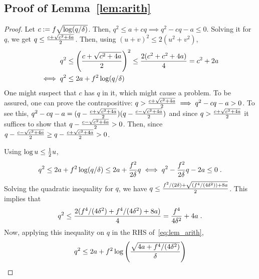 \vspace{-8pt}
\subsection{Proof of Lemma~\ref{lem:arith}}
\label{sec:proof_lem_arith}

\begin{proof}
Let $c := f\sqrt{\log(q/{\delta})}$. Then, $q^2 \le a + cq \implies q^2 -cq -a \le 0$. Solving it for $q$, we get $q \le { \frac{c + \sqrt{c^2 + 4a}}{2} }$.
Then, using $(u+v)^2 \le 2(u^2 + v^2)$,
\vspace{-4pt}
\begin{equation}\begin{aligned} \label{eq:lem_arith}
  q^2 &\le \left({ \frac{c + \sqrt{c^2 + 4a}}{2} }\right)^2 \le  { \frac{2(c^2 + c^2 + 4a)}{4} }  = c^2 + 2a  
\\\iff q^2 &\le 2a + f^2 \log(q/{\delta})
\end{aligned}\end{equation}
One might suspect that $c$ has $q$ in it, which might cause a problem.
To be assured, one can prove the contrapositive: $q > { \frac{c + \sqrt{c^2 + 4a}}{2} } \implies q^2-cq-a>0$.
To see this, $q^2-cq-a = (q - { \frac{c+\sqrt{c^2+4a}}{2} })(q - { \frac{c-\sqrt{c^2+4a}}{2} }) $ and since $ q > { \frac{c+\sqrt{c^2+4a}}{2} }$ it suffices to show that $q - { \frac{c-\sqrt{c^2+4a}}{2} }  > 0$.
Then, since $q - { \frac{c-\sqrt{c^2+4a}}{2} } \ge q - { \frac{c+\sqrt{c^2+4a}}{2} } > 0$.

Using $\log u \le { \frac{1}{2} } u$, 
\vspace{-4pt}
\[
  q^2 \le 2a + f^2 \log(q/{\delta}) \le 2a + { \frac{f^2 }{2{\delta}} }q  \iff q^2 - { \frac{f^2}{2{\delta}} }q - 2a \le 0\;.
\]
Solving the quadratic inequality for $q$, we have $q \le { \frac{f^2/(2{\ensuremath{\delta}} ) + \sqrt{(f^4/(4{\ensuremath{\delta}} ^2)) + 8a}}{2} }$.
This implies that 
\vspace{-4pt}
\[
  q^2 \le { \frac{2 (f^4/(4{\ensuremath{\delta}} ^2) + f^4/(4{\ensuremath{\delta}} ^2) + 8a)}{4} } = { \frac{f^4}{4{\delta}^2} } + 4a \;.
\]
Now, applying this inequality on $q$ in the RHS of~\eqref{eq:lem_arith},
\[
  q^2 \le 2a + f^2\log\left({ \frac{\sqrt{4a + f^4/(4{\delta}^2)}}{{\delta}} }\right)
\]
\end{proof}         
\vspace{-10pt}

